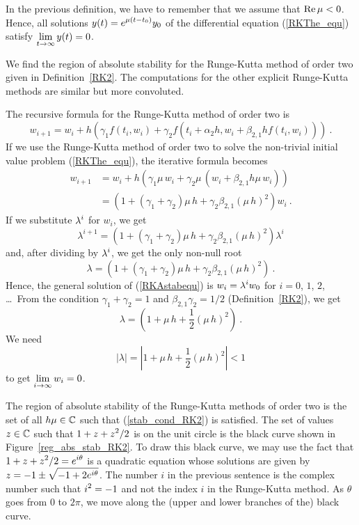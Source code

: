 \begin{rmk}
In the previous definition, we have to remember that we assume that
$\operatorname{Re} \mu <0$.  Hence, all solutions
$\displaystyle y(t) = e^{\mu (t-t_0)}y_0$ of the
differential equation (\ref{RKThe_equ}) satisfy
$\displaystyle \lim_{t\to \infty} y(t) = 0$.
\end{rmk}

\begin{egg}
We find the region of absolute stability for the Runge-Kutta
method of order two given in Definition~\ref{RK2}.  The computations
for the other explicit Runge-Kutta methods are similar but more convoluted.

The recursive formula for the Runge-Kutta method of order two is
\[
w_{i+1} = w_i + h \left( \gamma_1 f(t_i,w_i) + \gamma_2 f(t_i +
\alpha_2 h,w_i + \beta_{2,1} h f(t_i,w_i)) \right) \  .
\]
If we use the Runge-Kutta method of order two to solve the
non-trivial initial value problem (\ref{RKThe_equ}), the iterative
formula becomes
\begin{equation}\label{RKAstabequ}
\begin{split}
w_{i+1} &= w_i + h\left( \gamma_1 \mu\, w_i
+ \gamma_2 \mu\, (w_i + \beta_{2,1} h \mu\, w_i) \right) \\
 &= \left( 1 + (\gamma_1 + \gamma_2)\mu\, h + \gamma_2 \beta_{2,1}
(\mu\,h)^2 \right) w_i \ .
\end{split}
\end{equation}
If we substitute $\displaystyle \lambda^i$ for $w_i$, we get
\[
\lambda^{i+1} = \left( 1 + (\gamma_1 + \gamma_2)\mu\, h + \gamma_2
\beta_{2,1} (\mu\, h)^2 \right) \lambda^i
\]
and, after dividing by $\displaystyle \lambda^i$, we get the only non-null root
\[
\lambda = \left( 1 + (\gamma_1 + \gamma_2)\mu\, h + \gamma_2
\beta_{2,1} (\mu\, h)^2 \right) \ .
\]
Hence, the general solution of (\ref{RKAstabequ}) is
$\displaystyle w_i = \lambda^i w_0$ for $i=0$, $1$, $2$, \ldots\ From
the condition $\gamma_1 + \gamma_2 = 1$ and $\beta_{2,1} \gamma_2 = 1/2$
(Definition~\ref{RK2}), we get
\begin{equation} \label{abs_stab_cond_RK2}
\lambda = \left( 1 + \mu\, h + \frac{1}{2} (\mu\, h)^2 \right) \ .
\end{equation}
We need
\begin{equation} \label{stab_cond_RK2}
\left| \lambda \right| =
\left| 1 + \mu\, h + \frac{1}{2} (\mu\, h)^2 \right| < 1
\end{equation}
to get $\displaystyle \lim_{i\to \infty} w_i = 0$.

The region of absolute stability of the Runge-Kutta methods of order
two is the set of all $h\mu \in \mathbb{C}$ such that
(\ref{stab_cond_RK2}) is satisfied.  The set of values
$z \in \mathbb{C}$ such that $\displaystyle 1 + z + z^2/2$ is on the unit circle
is the black curve shown in Figure~\ref{reg_abs_stab_RK2}.
To draw this black curve, we may use the fact that
$\displaystyle 1 + z + z^2/2 = e^{i\theta}$ is a quadratic equation whose
solutions are given by $\displaystyle z = -1 \pm \sqrt{-1+2 e^{i \theta}}$.
The number $i$ in the previous sentence is the complex number such
that $\displaystyle i^2 = -1$ and not the index $i$ in the Runge-Kutta method.
As $\theta$ goes from $0$ to $2\pi$, we move along the (upper and
lower branches of the) black curve.


\end{egg}

